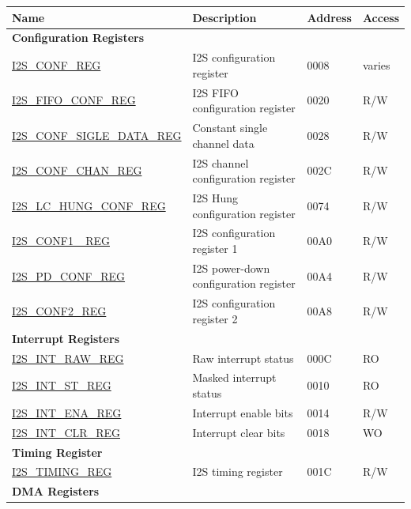 \begin{longtable}{ | p{6cm} | p{7.2cm} | p{1.3cm} | p{1cm} | }
\hline\rowcolor{lightgray}
Name & Description &  Address & Access \\ \hline
\endhead
\multicolumn{4}{|l|}{\textbf{Configuration Registers}} \\ \hline
\hyperref[regdesc:I2SCONFREG]{I2S\_CONF\_REG} & I2S configuration register & \hexprefix{}0008 & varies \\ \hline
\hyperref[regdesc:I2SFIFOCONFREG]{I2S\_FIFO\_CONF\_REG} & I2S FIFO configuration register & \hexprefix{}0020 & R/W \\ \hline
\hyperref[regdesc:I2SCONFSIGLEDATAREG]{I2S\_CONF\_SIGLE\_DATA\_REG} & Constant single channel data & \hexprefix{}0028 & R/W \\ \hline
\hyperref[regdesc:I2SCONFCHANREG]{I2S\_CONF\_CHAN\_REG} & I2S channel configuration register & \hexprefix{}002C & R/W \\ \hline
\hyperref[regdesc:I2SLCHUNGCONFREG]{I2S\_LC\_HUNG\_CONF\_REG} & I2S Hung configuration register & \hexprefix{}0074 & R/W \\ \hline
\hyperref[regdesc:I2SCONF1 REG]{I2S\_CONF1 \_REG} & I2S configuration register 1 & \hexprefix{}00A0 & R/W \\ \hline
\hyperref[regdesc:I2SPDCONFREG]{I2S\_PD\_CONF\_REG} & I2S power-down configuration register & \hexprefix{}00A4 & R/W \\ \hline
\hyperref[regdesc:I2SCONF2REG]{I2S\_CONF2\_REG} & I2S configuration register 2 & \hexprefix{}00A8 & R/W \\ \hline
\multicolumn{4}{|l|}{\textbf{Interrupt Registers}} \\ \hline
\hyperref[regdesc:I2SINTRAWREG]{I2S\_INT\_RAW\_REG} & Raw interrupt status & \hexprefix{}000C & RO \\ \hline
\hyperref[regdesc:I2SINTSTREG]{I2S\_INT\_ST\_REG} & Masked interrupt status & \hexprefix{}0010 & RO \\ \hline
\hyperref[regdesc:I2SINTENAREG]{I2S\_INT\_ENA\_REG} & Interrupt enable bits & \hexprefix{}0014 & R/W \\ \hline
\hyperref[regdesc:I2SINTCLRREG]{I2S\_INT\_CLR\_REG} & Interrupt clear bits & \hexprefix{}0018 & WO \\ \hline
\multicolumn{4}{|l|}{\textbf{Timing Register}} \\ \hline
\hyperref[regdesc:I2STIMINGREG]{I2S\_TIMING\_REG} & I2S timing register & \hexprefix{}001C & R/W \\ \hline
\multicolumn{4}{|l|}{\textbf{DMA Registers}} \\ \hline

\end{longtable}
